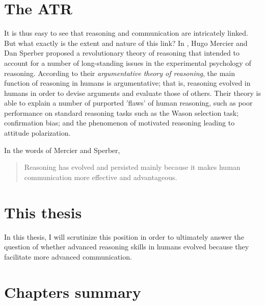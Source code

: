 \section{The ATR}

It is thus easy to see that reasoning and communication are intricately linked. But what exactly is the extent and nature of this link?
In \citeyear{MS11}, Hugo Mercier and Dan Sperber proposed a revolutionary
theory of reasoning that intended to account for a number of long-standing issues in the experimental psychology of reasoning.
According to their \emph{argumentative theory of reasoning}, the main function of reasoning in humans is argumentative; that is, reasoning evolved in humans in order to devise arguments and evaluate those of others. Their theory is able to explain a number of purported 'flaws' of human reasoning, such as poor performance on standard reasoning tasks such as the Wason selection task; confirmation bias; and the phenomenon of motivated reasoning leading to attitude polarization.

In the words of Mercier and Sperber,
\begin{quote}
    Reasoning has evolved and persisted mainly because it makes human communication more effective and advantageous.
    \citep[p.~60]{MS11}
\end{quote}

\section{This thesis}

In this thesis, I will scrutinize this position in order to ultimately
answer the question of whether advanced reasoning skills in humans evolved because they facilitate more advanced communication.


\section{Chapters summary}
